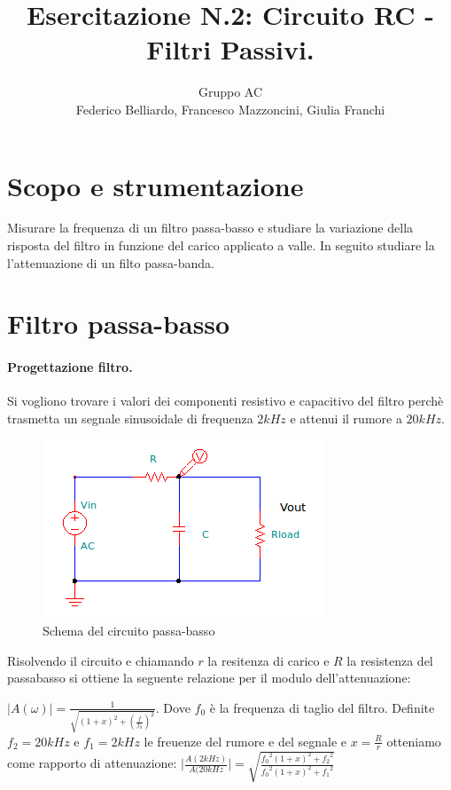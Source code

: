 \documentclass[10pt,a4paper]{article}
\author{Gruppo AC \\ Federico Belliardo, Francesco Mazzoncini, Giulia Franchi}
\title{Esercitazione N.2: Circuito RC - Filtri Passivi.}
\begin{document}
\maketitle


\section{Scopo e strumentazione}

Misurare la frequenza di un filtro passa-basso e studiare la variazione della risposta del filtro in funzione del carico applicato a valle. In seguito studiare la l'attenuazione di un filto passa-banda. 

\section{Filtro passa-basso}

\paragraph{Progettazione filtro.}
Si vogliono trovare i valori dei componenti resistivo e capacitivo del filtro perchè trasmetta un segnale sinusoidale di frequenza $2kHz$ e attenui il rumore a $20kHz$.

\begin{figure}[h]
\centering
\includegraphics[scale=1.0]{passabasso.png}
\caption{Schema del circuito passa-basso}
\end{figure}

Risolvendo il circuito e chiamando $r$ la resitenza di carico e $R$ la resistenza del passabasso si ottiene la seguente relazione per il modulo dell'attenuazione:

$\vert A(\omega) \vert = \frac{1}{\sqrt{(1+x)^2+(\frac{f}{f_{0}})^2}} $. Dove $f_0$ è la frequenza di taglio del filtro. Definite $f_2 = 20 kHz$ e $f_1 = 2 kHz$ le freuenze del rumore e del segnale e $x = \frac {R}{r}$ otteniamo come rapporto di attenuazione: 
$\vert \frac{A(2 kHz)}{A(20 kHz} \vert = \sqrt{\frac{{f_0}^2 (1+x)^2 + {f_2}^2}{{f_0}^2 (1+x)^2 + {f_1}^2}}$
\end{document}
